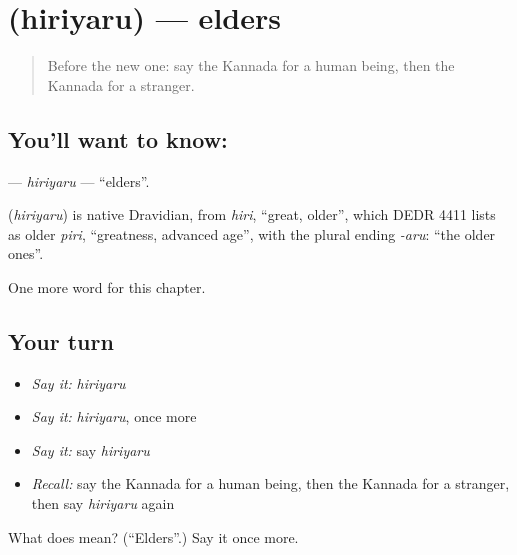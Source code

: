 \section[\texorpdfstring{\kn{ಹಿರಿಯರು} (hiriyaru)}{ಹಿರಿಯರು (hiriyaru)}]{ (hiriyaru) — elders}

\label{lesson:KA-C299-hiriyaru}



\begin{quote}
Before the new one: say the Kannada for a human being, then the Kannada for a stranger.
\end{quote}

\subsection*{You'll want to know: }
\textbf{} — \emph{hiriyaru} — \textquotedblleft{}elders\textquotedblright{}.

\begin{cousinweb}
\textbf{} (\emph{hiriyaru}) is native Dravidian, from \emph{hiri}, \textquotedblleft{}great, older\textquotedblright{}, which DEDR 4411 lists as older \emph{piri}, \textquotedblleft{}greatness, advanced age\textquotedblright{}, with the plural ending \emph{-aru}: \textquotedblleft{}the older ones\textquotedblright{}.
\end{cousinweb}

\begin{grammarlens}[title={What you've built}]
One more word for this chapter.
\end{grammarlens}

\subsection*{Your turn}
\begin{itemize}
\raggedright
  \item \emph{Say it:} \emph{hiriyaru}
  \item \emph{Say it:} \emph{hiriyaru}, once more
  \item \emph{Say it:} say \emph{hiriyaru}
  \item \emph{Recall:} say the Kannada for a human being, then the Kannada for a stranger, then say \emph{hiriyaru} again
\end{itemize}

\begin{tcolorbox}[breakable,colback=teal!4,colframe=teal!35!black,title={Before you move on}]
What does  mean? (\textquotedblleft{}Elders\textquotedblright{}.) Say it once more.
\end{tcolorbox}
